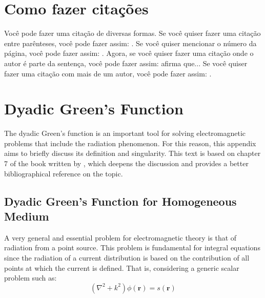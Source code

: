 
	\chapter{Como fazer citações}

		Você pode fazer uma citação de diversas formas. Se você quiser fazer uma citação entre parênteses, você pode fazer assim: \citep{milgram1969note}. Se você quiser mencionar o número da página, você pode fazer assim: \citep[p. 10]{deb2002fast}. Agora, se você quiser fazer uma citação onde o autor é parte da sentença, você pode fazer assim: \cite{maxwell1865viii} afirma que... Se você quiser fazer uma citação com mais de um autor, você pode fazer assim: \citep{van2019fantastic,griffiths2013}.

	\chapter{Dyadic Green's Function}\label{app:green}
	
		The dyadic Green's function is an important tool for solving electromagnetic problems that include the radiation phenomenon. For this reason, this appendix aims to briefly discuss its definition and singularity. This text is based on chapter 7 of the book written by \cite{chew1995}, which deepens the discussion and provides a better bibliographical reference on the topic.

		\section{Dyadic Green's Function for Homogeneous Medium}\label{app:green:1}

			A very general and essential problem for electromagnetic theory is that of radiation from a point source. This problem is fundamental for integral equations since the radiation of a current distribution is based on the contribution of all points at which the current is defined. That is, considering a generic scalar problem such as:
			\begin{equation}
				(\nabla^2+k^2)\phi(\mathbf{r}) = s(\mathbf{r}) \label{eq:app:green:1}
			\end{equation}

